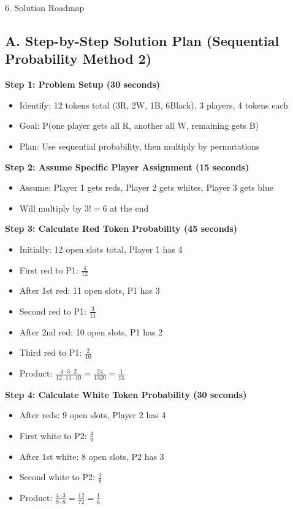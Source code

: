 \documentclass[12pt]{article}
\begin{document}
\begin{roadmapbox}{6. Solution Roadmap}

\subsection*{A. Step-by-Step Solution Plan (Sequential Probability Method 2)}

\textbf{Step 1: Problem Setup (30 seconds)}
\begin{itemize}
    \item Identify: 12 tokens total (3R, 2W, 1B, 6Black), 3 players, 4 tokens each
    \item Goal: P(one player gets all R, another all W, remaining gets B)
    \item Plan: Use sequential probability, then multiply by permutations
\end{itemize}

\textbf{Step 2: Assume Specific Player Assignment (15 seconds)}
\begin{itemize}
    \item Assume: Player 1 gets reds, Player 2 gets whites, Player 3 gets blue
    \item Will multiply by $3! = 6$ at the end
\end{itemize}

\textbf{Step 3: Calculate Red Token Probability (45 seconds)}
\begin{itemize}
    \item Initially: 12 open slots total, Player 1 has 4
    \item First red to P1: $\frac{4}{12}$
    \item After 1st red: 11 open slots, P1 has 3
    \item Second red to P1: $\frac{3}{11}$
    \item After 2nd red: 10 open slots, P1 has 2
    \item Third red to P1: $\frac{2}{10}$
    \item Product: $\frac{4 \cdot 3 \cdot 2}{12 \cdot 11 \cdot 10} = \frac{24}{1320} = \frac{1}{55}$
\end{itemize}

\textbf{Step 4: Calculate White Token Probability (30 seconds)}
\begin{itemize}
    \item After reds: 9 open slots, Player 2 has 4
    \item First white to P2: $\frac{4}{9}$
    \item After 1st white: 8 open slots, P2 has 3
    \item Second white to P2: $\frac{3}{8}$
    \item Product: $\frac{4 \cdot 3}{9 \cdot 8} = \frac{12}{72} = \frac{1}{6}$
\end{itemize}


\end{roadmapbox}
\end{document}
